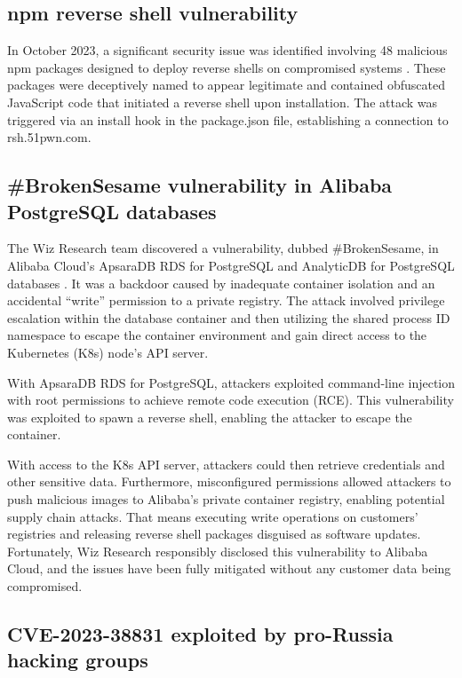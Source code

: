 \subsection*{npm reverse shell vulnerability}

In October 2023, a significant security issue was identified involving 48 malicious npm packages designed to deploy reverse shells on compromised systems \cite{npm-vulnerability}. These packages were deceptively named to appear legitimate and contained obfuscated JavaScript code that initiated a reverse shell upon installation. The attack was triggered via an install hook in the package.json file, establishing a connection to rsh.51pwn.com.


\subsection*{\#BrokenSesame vulnerability in Alibaba PostgreSQL databases}

The Wiz Research team discovered a vulnerability, dubbed \#BrokenSesame, in Alibaba Cloud's ApsaraDB RDS for PostgreSQL and AnalyticDB for PostgreSQL databases \cite{BrokenSesame}. It was a backdoor caused by inadequate container isolation and an accidental ``write'' permission to a private registry. The attack involved privilege escalation within the database container and then utilizing the shared process ID namespace to escape the container environment and gain direct access to the Kubernetes (K8s) node's API server.

With ApsaraDB RDS for PostgreSQL, attackers exploited command-line injection with root permissions to achieve remote code execution (RCE). This vulnerability was exploited to spawn a reverse shell, enabling the attacker to escape the container.

With access to the K8s API server, attackers could then retrieve credentials and other sensitive data. Furthermore, misconfigured permissions allowed attackers to push malicious images to Alibaba's private container registry, enabling potential supply chain attacks. That means executing write operations on customers' registries and releasing reverse shell packages disguised as software updates. Fortunately, Wiz Research responsibly disclosed this vulnerability to Alibaba Cloud, and the issues have been fully mitigated without any customer data being compromised.


\subsection*{CVE-2023-38831 exploited by pro-Russia hacking groups}

